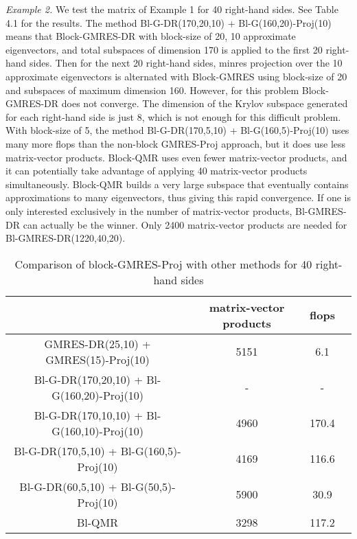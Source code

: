 \documentclass[final]{siamltex}
\begin{document}
{\it Example 2.}  We test the matrix of Example 1 for 40 right-hand sides.  See Table 4.1 for the results.  The method Bl-G-DR(170,20,10) + Bl-G(160,20)-Proj(10) means that Block-GMRES-DR with block-size of 20, 10 approximate eigenvectors, and total subspaces of dimension 170 is applied to the first 20 right-hand sides.  Then for the next 20 right-hand sides, minres projection over the 10 approximate eigenvectors is alternated with Block-GMRES using block-size of 20 and subspaces of maximum dimension 160.  However, for this problem Block-GMRES-DR does not converge.  The dimension of the Krylov subspace generated for each right-hand side is just 8, which is not enough for this difficult problem.  With block-size of 5, the method Bl-G-DR(170,5,10) + Bl-G(160,5)-Proj(10) uses many more flops than the non-block GMRES-Proj approach, but it does use less matrix-vector products.  Block-QMR uses even fewer matrix-vector products, and it can potentially take advantage of applying 40 matrix-vector products simultaneously.  Block-QMR builds a very large subspace that eventually contains approximations to many eigenvectors, thus giving this rapid convergence.  If one is only interested exclusively in the number of matrix-vector products, Bl-GMRES-DR can actually be the winner.  Only 2400 matrix-vector products are needed for Bl-GMRES-DR(1220,40,20).

\begin{table}
\caption{Comparison of block-GMRES-Proj with other methods for 40 right-hand sides} 

\begin{center} \footnotesize
\begin{tabular}{|c|c|c|c|}  \hline\hline
       & matrix-vector products  &  flops     \\  
\hline \hline
GMRES-DR(25,10) + GMRES(15)-Proj(10)       &  5151   &   6.1   \\ \hline
Bl-G-DR(170,20,10) + Bl-G(160,20)-Proj(10)   &   -     &  -      \\ \hline
Bl-G-DR(170,10,10) + Bl-G(160,10)-Proj(10)   &  4960   &  170.4  \\ \hline
Bl-G-DR(170,5,10) + Bl-G(160,5)-Proj(10)     &  4169   &  116.6  \\ \hline
Bl-G-DR(60,5,10) + Bl-G(50,5)-Proj(10)       &  5900   &   30.9  \\ \hline
Bl-QMR                                     &  3298   &  117.2  \\ \hline

\hline\hline 

\end{tabular} 
\end{center} 
\end{table} 
\end{document}
